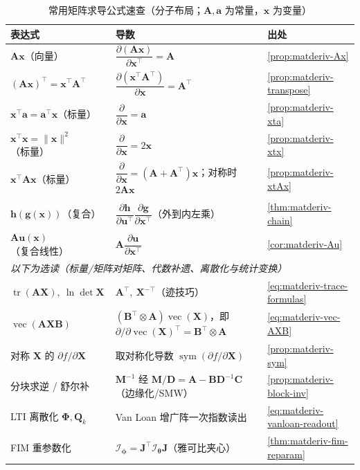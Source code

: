 \begin{table}[H]\centering\small
\caption{常用矩阵求导公式速查（分子布局；$\mathbf{A},\mathbf{a}$ 为常量，$\mathbf{x}$ 为变量）}
\label{app:matderiv-formula-table}
\begin{tabular}{lll}
\toprule
表达式 & 导数 & 出处 \\
\midrule
$\mathbf{A}\mathbf{x}$（向量） & $\dfrac{\partial(\mathbf{A}\mathbf{x})}{\partial\mathbf{x}^\top}=\mathbf{A}$ & \cref{prop:matderiv-Ax} \\[1.4ex]
$(\mathbf{A}\mathbf{x})^\top=\mathbf{x}^\top\mathbf{A}^\top$ & $\dfrac{\partial(\mathbf{x}^\top\mathbf{A}^\top)}{\partial\mathbf{x}}=\mathbf{A}^\top$ & \cref{prop:matderiv-transpose} \\[1.4ex]
$\mathbf{x}^\top\mathbf{a}=\mathbf{a}^\top\mathbf{x}$（标量） & $\dfrac{\partial}{\partial\mathbf{x}}=\mathbf{a}$ & \cref{prop:matderiv-xta} \\[1.4ex]
$\mathbf{x}^\top\mathbf{x}=\|\mathbf{x}\|^2$（标量） & $\dfrac{\partial}{\partial\mathbf{x}}=2\mathbf{x}$ & \cref{prop:matderiv-xtx} \\[1.4ex]
$\mathbf{x}^\top\mathbf{A}\mathbf{x}$（标量） & $\dfrac{\partial}{\partial\mathbf{x}}=(\mathbf{A}+\mathbf{A}^\top)\mathbf{x}$；对称时 $2\mathbf{A}\mathbf{x}$ & \cref{prop:matderiv-xtAx} \\[1.4ex]
$\mathbf{h}(\mathbf{g}(\mathbf{x}))$（复合） & $\dfrac{\partial\mathbf{h}}{\partial\mathbf{u}^\top}\dfrac{\partial\mathbf{g}}{\partial\mathbf{x}^\top}$（外到内左乘） & \cref{thm:matderiv-chain} \\[1.4ex]
$\mathbf{A}\mathbf{u}(\mathbf{x})$（复合线性） & $\mathbf{A}\dfrac{\partial\mathbf{u}}{\partial\mathbf{x}^\top}$ & \cref{cor:matderiv-Au} \\[1.4ex]
\midrule
\multicolumn{3}{l}{\emph{以下为选读（标量/矩阵对矩阵、代数补遗、离散化与统计变换）}}\\[0.4ex]
$\operatorname{tr}(\mathbf{A}\mathbf{X}),\ \ln\det\mathbf{X}$ & $\mathbf{A}^\top,\ \mathbf{X}^{-\top}$（迹技巧） & \cref{eq:matderiv-trace-formulas} \\[1.4ex]
$\operatorname{vec}(\mathbf{A}\mathbf{X}\mathbf{B})$ & $(\mathbf{B}^\top\otimes\mathbf{A})\operatorname{vec}(\mathbf{X})$，即 $\partial/\partial\operatorname{vec}(\mathbf{X})^\top=\mathbf{B}^\top\otimes\mathbf{A}$ & \cref{eq:matderiv-vec-AXB} \\[1.4ex]
对称 $\mathbf{X}$ 的 $\partial f/\partial\mathbf{X}$ & 取对称化导数 $\operatorname{sym}(\partial f/\partial\mathbf{X})$ & \cref{prop:matderiv-sym} \\[1.4ex]
分块求逆 / 舒尔补 & $\mathbf{M}^{-1}$ 经 $\mathbf{M}/\mathbf{D}=\mathbf{A}-\mathbf{B}\mathbf{D}^{-1}\mathbf{C}$（边缘化/SMW） & \cref{prop:matderiv-block-inv} \\[1.4ex]
LTI 离散化 $\boldsymbol{\Phi},\mathbf{Q}_k$ & Van Loan 增广阵一次指数读出 & \cref{eq:matderiv-vanloan-readout} \\[1.4ex]
FIM 重参数化 & $\boldsymbol{\mathcal{I}}_{\boldsymbol{\phi}}=\mathbf{J}^\top\boldsymbol{\mathcal{I}}_{\boldsymbol{\theta}}\mathbf{J}$（雅可比夹心） & \cref{thm:matderiv-fim-reparam} \\
\bottomrule
\end{tabular}
\end{table}

